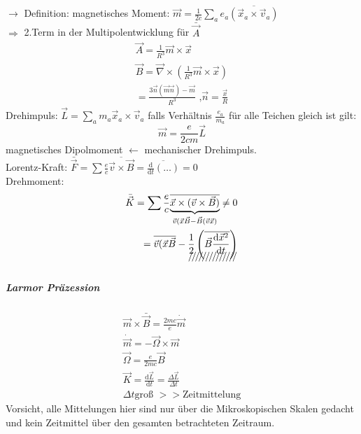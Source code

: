 \documentclass[a4paper]{article}
\begin{document}
$\rightarrow$ Definition:
magnetisches Moment: $\vec{m}=\frac{1}{2c}\sum_a e_a\overline{\left(
\vec{x}_a\times\vec{v}_a \right)}$\\
$\Rightarrow$ 2.Term in der Multipolentwicklung für $\bar{\vec{A}}$\\
\begin{align}
\vec{A}=\frac{1}{R^3}\vec{m}\times\vec{x}\\
\vec{B}=\vec{\nabla}\times\left( \frac{1}{R^3}\vec{m}\times\vec{x} \right)\\
=\frac{3\vec{n}(\vec{m}\vec{n})-\vec{m}}{R^3}\text{ ,
}\vec{n}=\frac{\vec{x}}{R}
\end{align}
Drehimpuls: $\vec{L}=\sum_a m_a \vec{x}_a\times\vec{v}_a$
falls Verhältnis $\frac{e_a}{m_a}$ für alle Teichen gleich ist gilt:
\begin{equation}
\vec{m}=\frac{e}{2cm}\vec{L}
\end{equation} 
magnetisches Dipolmoment $\leftarrow$ mechanischer Drehimpuls.\\
Lorentz-Kraft: $\bar{\vec{F}}=\sum
\frac{e}{c}\overline{\vec{v}\times\vec{B}}=\overline{\frac{\mathrm{d}}{\mathrm{d}t}\left(\ldots
\right)}=0$\\
Drehmoment: 
\begin{align}
\bar{\vec{K}}=\sum\frac{e}{c}\overline{\underbrace{\vec{x}\times(\vec{v}
\times\vec{B})}_{\vec{v}(\vec{x}\vec{B}-\vec{B}(\vec{v}\vec{x})}}\neq0\\
=\overline{\vec{v}(\vec{x}\vec{B}}-\xout{\frac{1}{2}\left(
\overline{\vec{B}\frac{\mathrm{d}\vec{x}^2}{\mathrm{d}t}} \right)}\\
\end{align}
\subparagraph{Larmor Präzession}
\begin{align}
\vec{m}\times\bar{\vec{B}}=\frac{2mc}{e}\dot{\vec{m}}\\
\dot{\vec{m}}=-\vec{\Omega}\times\vec{m}\\
\vec{\Omega}=\frac{e}{2mc}\vec{B}\\
\vec{K}=\frac{\mathrm{d}\vec{L}}{\mathrm{d}t}=\frac{\Delta\vec{L}}{\Delta t}\\
\Delta t \text{groß }>>\text{Zeitmittelung}
\end{align}
Vorsicht, alle Mittelungen hier sind nur über die Mikroskopischen Skalen gedacht
und kein Zeitmittel über den gesamten betrachteten Zeitraum.
\end{document}
